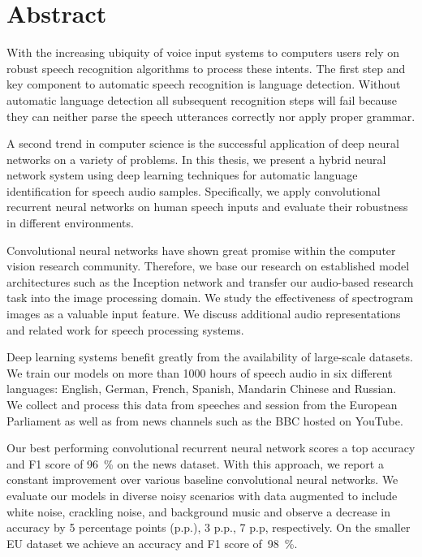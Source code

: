 \section*{\LARGE Abstract}
With the increasing ubiquity of voice input systems to computers users rely on robust speech recognition algorithms to process these intents. The first step and key component to automatic speech recognition is language detection. Without automatic language detection all subsequent recognition steps will fail because they can neither parse the speech utterances correctly nor apply proper grammar.

A second trend in computer science is the successful application of deep neural networks on a variety of problems. In this thesis, we present a hybrid neural network system using deep learning techniques for automatic language identification for speech audio samples. Specifically, we apply convolutional recurrent neural networks on human speech inputs and evaluate their robustness in different environments.

Convolutional neural networks have shown great promise within the computer vision research community. Therefore, we base our research on established model architectures such as the Inception network\cite{szegedy2015going} and transfer our audio-based research task into the image processing domain. We study the effectiveness of spectrogram images as a valuable input feature. We discuss additional audio representations and related work for speech processing systems.

Deep learning systems benefit greatly from the availability of large-scale datasets. We train our models on more than \num{1000} hours of speech audio in six different languages: English, German, French, Spanish, Mandarin Chinese and Russian. We collect and process this data from speeches and session from the European Parliament as well as from news channels such as the BBC hosted on YouTube.

Our best performing convolutional recurrent neural network scores a top accuracy and F1 score of \SI{96}{\percent} on the news dataset. With this approach, we report a constant improvement over various baseline convolutional neural networks. We evaluate our models in diverse noisy scenarios with data augmented to include white noise, crackling noise, and background music and observe a decrease in accuracy by 5 percentage points (p.p.), 3 p.p., 7 p.p, respectively. On the smaller EU dataset we achieve an accuracy and F1 score of~\SI{98}{\percent}.

